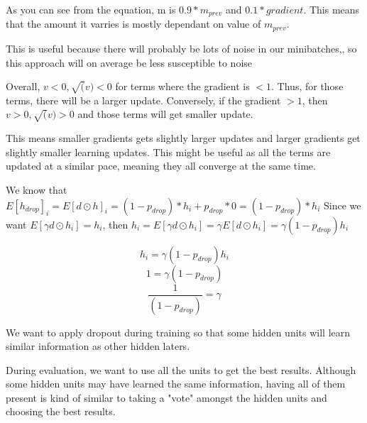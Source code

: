 \documentclass[11pt,largemargins]{homework}
\begin{document}
\maketitle
 
\question
As you can see from the equation, m is $0.9 * m_{prev}$ and $0.1 * gradient$. This means that the amount it varries is mostly dependant on value of $m_{prev}$. 

This is useful because there will probably be lots of noise in our minibatches,, so this approach will on average be less susceptible to noise

\question
Overall, $v<0, \sqrt(v) < 0$ for terms where the gradient is $<1$. Thus, for those terms, there will be a  larger update. Conversely, if the gradient $>1$, then $v > 0, \sqrt(v) > 0$ and those terms will get smaller update. 

This means smaller gradients gets slightly larger updates and larger gradients get slightly smaller learning updates. This might be useful as all the terms are updated at a similar pace, meaning they all converge at the same time. 

\question
We know that $E[h_{drop}]_i = E[d \odot h]_i = (1-p_{drop}) * h_i  + p_{drop} * 0 = (1-p_{drop}) * h_i$
Since we want $E[\gamma d \odot h_i] = h_i$, then $h_i = E[\gamma d \odot h_i] = \gamma  E[d \odot h_i] = \gamma (1-p_{drop}) h_i $


$$ h_i = \gamma (1-p_{drop}) h_i $$
$$ 1 = \gamma (1-p_{drop}) $$
$$ \frac{1}{(1-p_{drop})} = \gamma $$

\question
We want to apply dropout during training so that some hidden units will learn similar information as other hidden laters. 

During evaluation, we want to use all the units to get the best results. Although some hidden units may have learned the same information, having all of them present is kind of similar to taking a "vote" amongst the hidden units and choosing the best results. 

\question
\end{document}
